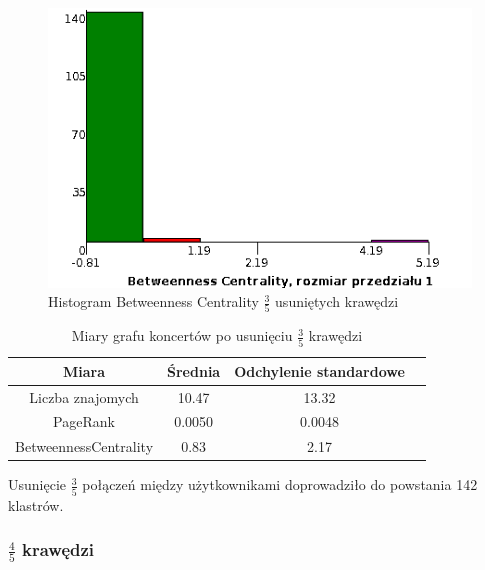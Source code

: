 \documentclass[10pt,a4paper]{article}
\begin{document}
\begin{figure}[H]
\centering
\caption{Histogram Betweenness Centrality $\frac{3}{5}$ usuniętych krawędzi}
\includegraphics[scale=0.6]{wyniki/final200Events/3200eventsBCHist.png}
\end{figure}


\begin{table}[H]
  \caption{Miary grafu koncertów po usunięciu $\frac{3}{5}$ krawędzi}
  \centering
    \begin{tabular}{cccc}
    \addlinespace
    \toprule
    Miara & Średnia  & Odchylenie standardowe \\
    \midrule
    Liczba znajomych & 10.47 & 13.32 \\
    PageRank & 0.0050 & 0.0048 \\
    BetweennessCentrality & 0.83 & 2.17\\ 
    \bottomrule
    \end{tabular}
  \label{tab:addlabel}
\end{table}

Usunięcie $\frac{3}{5}$ połączeń między użytkownikami doprowadziło do powstania 142 klastrów. 

\subsubsection {$\frac{4}{5}$ krawędzi}
\end{document}

